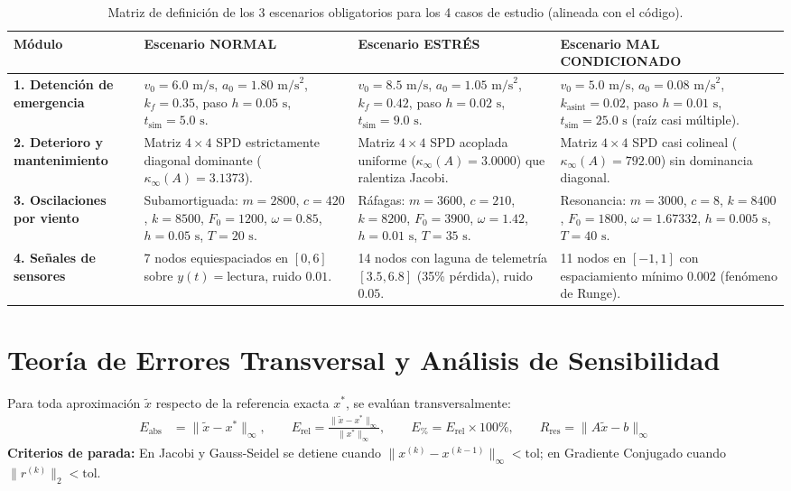 \documentclass[a4paper,12pt]{article}
\begin{document}
\begin{table}[H]
\centering
\scriptsize
\setlength{\tabcolsep}{3pt}
\begin{adjustbox}{max width=\textwidth}
\begin{tabular}{>{\bfseries}p{2.0cm} p{4.1cm} p{4.1cm} p{4.1cm}}
\toprule
Módulo & Escenario NORMAL & Escenario ESTRÉS & Escenario MAL CONDICIONADO \\
\midrule
1. Detención de emergencia & $v_0=6.0\text{ m/s}$, $a_0=1.80\text{ m/s}^2$, $k_f=0.35$, paso $h=0.05\text{ s}$, $t_{\text{sim}}=5.0\text{ s}$. & $v_0=8.5\text{ m/s}$, $a_0=1.05\text{ m/s}^2$, $k_f=0.42$, paso $h=0.02\text{ s}$, $t_{\text{sim}}=9.0\text{ s}$. & $v_0=5.0\text{ m/s}$, $a_0=0.08\text{ m/s}^2$, $k_{\text{asint}}=0.02$, paso $h=0.01\text{ s}$, $t_{\text{sim}}=25.0\text{ s}$ (raíz casi múltiple). \\
\midrule
2. Deterioro y mantenimiento & Matriz $4\times 4$ SPD estrictamente diagonal dominante ($\kappa_\infty(A) = 3.1373$). & Matriz $4\times 4$ SPD acoplada uniforme ($\kappa_\infty(A) = 3.0000$) que ralentiza Jacobi. & Matriz $4\times 4$ SPD casi colineal ($\kappa_\infty(A) = 792.00$) sin dominancia diagonal. \\
\midrule
3. Oscilaciones por viento & Subamortiguada: $m=2800$, $c=420$, $k=8500$, $F_0=1200$, $\omega=0.85$, $h=0.05\text{ s}$, $T=20\text{ s}$. & Ráfagas: $m=3600$, $c=210$, $k=8200$, $F_0=3900$, $\omega=1.42$, $h=0.01\text{ s}$, $T=35\text{ s}$. & Resonancia: $m=3000$, $c=8$, $k=8400$, $F_0=1800$, $\omega=1.67332$, $h=0.005\text{ s}$, $T=40\text{ s}$. \\
\midrule
4. Señales de sensores & 7 nodos equiespaciados en $[0,6]$ sobre $y(t)=\text{lectura}$, ruido $0.01$. & 14 nodos con laguna de telemetría $[3.5,6.8]$ (35\% pérdida), ruido $0.05$. & 11 nodos en $[-1,1]$ con espaciamiento mínimo $0.002$ (fenómeno de Runge). \\
\bottomrule
\end{tabular}
\end{adjustbox}
\caption{Matriz de definición de los 3 escenarios obligatorios para los 4 casos de estudio (alineada con el código).}
\end{table}

\section{Teoría de Errores Transversal y Análisis de Sensibilidad}

Para toda aproximación $\tilde{x}$ respecto de la referencia exacta $x^*$, se evalúan transversalmente:
\begin{align}
    E_{\text{abs}} &= \|\tilde{x} - x^*\|_\infty, \qquad E_{\text{rel}} = \frac{\|\tilde{x} - x^*\|_\infty}{\|x^*\|_\infty}, \qquad E_{\%} = E_{\text{rel}} \times 100\%, \qquad R_{\text{res}} = \|A\tilde{x} - b\|_\infty
\end{align}
\textbf{Criterios de parada:} En Jacobi y Gauss-Seidel se detiene cuando $\|x^{(k)} - x^{(k-1)}\|_\infty < \text{tol}$; en Gradiente Conjugado cuando $\|r^{(k)}\|_2 < \text{tol}$.
\end{document}
